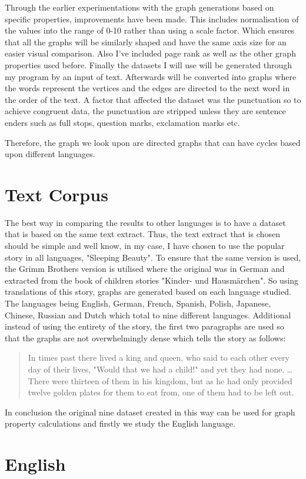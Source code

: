 Through the earlier experimentations with the graph generations based on specific properties, improvements have been made. This includes normalisation of the values into the range of 0-10 rather than using a scale factor. Which ensures that all the graphs will be similarly shaped and have the same axis size for an easier visual comparison. Also I've included page rank as well as the other graph properties used before. Finally the datasets I will use will be generated through my program by an input of text. Afterwards will be converted into graphs where the words represent the vertices and the edges are directed to the next word in the order of the text. A factor that affected the dataset was the punctuation so to achieve congruent data, the punctuation are stripped unless they are sentence enders such as full stops, question marks, exclamation marks etc. 

Therefore, the graph we look upon are directed graphs that can have cycles based upon different languages.
\section{Text Corpus}
The best way in comparing the results to other languages is to have a dataset that is based on the same text extract. Thus, the text extract that is chosen should be simple and well know, in my case, I have chosen to use the popular story in all languages, "Sleeping Beauty". To ensure that the same version is used, the Grimm Brothers version is utilised where the original was in German and extracted from the book of children stories "Kinder- und Hausmärchen"\cite{grimm1857kinder}. So using translations of this story, graphs are generated based on each language studied. The languages being English, German, French, Spanish, Polish, Japanese, Chinese, Russian and Dutch which total to nine different languages. Additional instead of using the entirety of the story, the first two paragraphs are used so that the graphs are not overwhelmingly dense which tells the story as follows:
\begin{quote}
In times past there lived a king and queen, who said to each other every day of their lives, "Would that we had a child!" and yet they had none. \dots There were thirteen of them in his kingdom, but as he had only provided twelve golden plates for them to eat from, one of them had to be left out.
\end{quote}
In conclusion the original nine dataset created in this way can be used for graph property calculations and firstly we study the English language.

\section{English}
